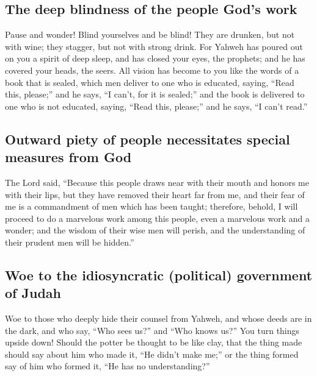 \hypertarget{the-deep-blindness-of-the-people-gods-work}{%
\subsection{The deep blindness of the people God's
work}\label{the-deep-blindness-of-the-people-gods-work}}

 Pause and wonder! Blind yourselves and be blind! They are
drunken, but not with wine; they stagger, but not with strong drink.
 For Yahweh has poured out on you a spirit of deep sleep,
and has closed your eyes, the prophets; and he has covered your heads,
the seers.  All vision has become to you like the words
of a book that is sealed, which men deliver to one who is educated,
saying, ``Read this, please;'' and he says, ``I can't, for it is
sealed;''  and the book is delivered to one who is not
educated, saying, ``Read this, please;'' and he says, ``I can't read.''

\hypertarget{outward-piety-of-people-necessitates-special-measures-from-god}{%
\subsection{Outward piety of people necessitates special measures from
God}\label{outward-piety-of-people-necessitates-special-measures-from-god}}

 The Lord said, ``Because this people draws near with
their mouth and honors me with their lips, but they have removed their
heart far from me, and their fear of me is a commandment of men which
has been taught;  therefore, behold, I will proceed to do
a marvelous work among this people, even a marvelous work and a wonder;
and the wisdom of their wise men will perish, and the understanding of
their prudent men will be hidden.''

\hypertarget{woe-to-the-idiosyncratic-political-government-of-judah}{%
\subsection{Woe to the idiosyncratic (political) government of
Judah}\label{woe-to-the-idiosyncratic-political-government-of-judah}}

 Woe to those who deeply hide their counsel from Yahweh,
and whose deeds are in the dark, and who say, ``Who sees us?'' and ``Who
knows us?''  You turn things upside down! Should the
potter be thought to be like clay, that the thing made should say about
him who made it, ``He didn't make me;'' or the thing formed say of him
who formed it, ``He has no understanding?''

